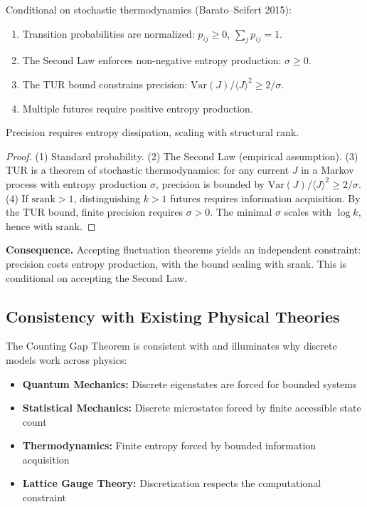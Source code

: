 \begin{theorem}\label{thm:tur-bridge}
Conditional on stochastic thermodynamics (Barato--Seifert 2015):
\begin{enumerate}
\item Transition probabilities are normalized: $p_{ij} \geq 0$, $\sum_j p_{ij} = 1$.
\item The Second Law enforces non-negative entropy production: $\sigma \geq 0$.
\item The TUR bound constrains precision: $\mathrm{Var}(J)/\langle J \rangle^2 \geq 2/\sigma$.
\item Multiple futures require positive entropy production.
\end{enumerate}
Precision requires entropy dissipation, scaling with structural rank.
\end{theorem}

\begin{proof}
(1) Standard probability. (2) The Second Law (empirical assumption). (3) TUR is a theorem of stochastic thermodynamics: for any current $J$ in a Markov process with entropy production $\sigma$, precision is bounded by $\mathrm{Var}(J)/\langle J \rangle^2 \geq 2/\sigma$.
(4) If $\mathrm{srank} > 1$, distinguishing $k > 1$ futures requires information acquisition. By the TUR bound, finite precision requires $\sigma > 0$. The minimal $\sigma$ scales with $\log k$, hence with $\mathrm{srank}$.
\end{proof}

\noindent\textbf{Consequence.} Accepting fluctuation theorems yields an independent constraint: precision costs entropy production, with the bound scaling with srank. This is conditional on accepting the Second Law.

\subsection{Consistency with Existing Physical Theories}\label{sec:intro-justifies-physics}

The Counting Gap Theorem is consistent with and illuminates why discrete models work across physics:

\begin{itemize}
\item \textbf{Quantum Mechanics:} Discrete eigenstates are forced for bounded systems
\item \textbf{Statistical Mechanics:} Discrete microstates forced by finite accessible state count
\item \textbf{Thermodynamics:} Finite entropy forced by bounded information acquisition
\item \textbf{Lattice Gauge Theory:} Discretization respects the computational constraint
\end{itemize}

